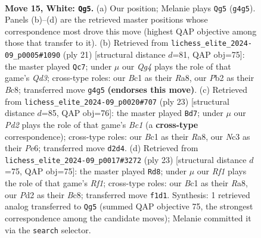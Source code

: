 \documentclass[11pt]{article}
\begin{document}
\clearpage

\begin{figure}[p]\centering
\begin{subfigure}{0.46\textwidth}\centering
\resizebox{\linewidth}{!}{%
\newchessgame
\chessboard[
  setfen={r1bq1rk1/pp1pppbp/3n4/2p5/2P3Q1/2N2N2/PP1P1PBP/R1B2RK1 w - - 3 15},
  showmover=false,
  pgfstyle=straightmove, color=movearrow, markmove={g4-g5}
]}
\caption{}
\end{subfigure}\hfill
\begin{subfigure}{0.46\textwidth}\centering
\resizebox{\linewidth}{!}{%
\newchessgame
\chessboard[
  setfen={r1b1kb1r/1p3ppp/p2qpn2/8/3N4/1B6/PPP2PPP/R1BQ1RK1 b kq - 1 11},
  showmover=false,
  pgfstyle=straightmove, color=movearrow, markmove={d6-c7}
]}
\caption{}
\end{subfigure}
\\[4pt]
\begin{subfigure}{0.46\textwidth}\centering
\resizebox{\linewidth}{!}{%
\newchessgame
\chessboard[
  setfen={r1b2rk1/pp2bppp/3qpn2/8/3N4/1BP5/PP3PPP/R1BQ1RK1 b - - 2 12},
  showmover=false,
  pgfstyle=straightmove, color=movearrow, markmove={c8-d7}
]}
\caption{}
\end{subfigure}\hfill
\begin{subfigure}{0.46\textwidth}\centering
\resizebox{\linewidth}{!}{%
\newchessgame
\chessboard[
  setfen={r1b2rk1/pp2bppp/3qpn2/8/3N4/1B6/PPP2PPP/R1BQR1K1 b - - 4 12},
  showmover=false,
  pgfstyle=straightmove, color=movearrow, markmove={f8-d8}
]}
\caption{}
\end{subfigure}
\caption{\textbf{Move 15, White: \texttt{Qg5}.} (a) Our position; Melanie plays \texttt{Qg5} (\texttt{g4g5}). Panels (b)--(d) are the retrieved master positions whose correspondence most drove this move (highest QAP objective among those that transfer to it). (b) Retrieved from \texttt{lichess\_elite\_2024-09\_p0005\#1090} (ply 21) [structural distance $d$=81, QAP obj=75]: the master played \texttt{Qc7}; under $\mu$ our \emph{Qg4} plays the role of that game's \emph{Qd3}; cross-type roles: our \emph{B}c1 as their \emph{R}a8, our \emph{P}b2 as their \emph{B}c8; transferred move \texttt{g4g5} \textbf{(endorses this move)}. (c) Retrieved from \texttt{lichess\_elite\_2024-09\_p0020\#707} (ply 23) [structural distance $d$=85, QAP obj=76]: the master played \texttt{Bd7}; under $\mu$ our \emph{Pd2} plays the role of that game's \emph{Bc1} (a \textbf{cross-type} correspondence); cross-type roles: our \emph{B}c1 as their \emph{R}a8, our \emph{N}c3 as their \emph{P}e6; transferred move \texttt{d2d4}. (d) Retrieved from \texttt{lichess\_elite\_2024-09\_p0017\#3272} (ply 23) [structural distance $d$=75, QAP obj=75]: the master played \texttt{Rd8}; under $\mu$ our \emph{Rf1} plays the role of that game's \emph{Rf1}; cross-type roles: our \emph{B}c1 as their \emph{R}a8, our \emph{P}d2 as their \emph{B}c8; transferred move \texttt{f1d1}. Synthesis: 1 retrieved analog transferred to \texttt{Qg5} (summed QAP objective 75, the strongest correspondence among the candidate moves); Melanie committed it via the \texttt{search} selector.}
\label{fig:thought-m28}
\end{figure}
\end{document}

